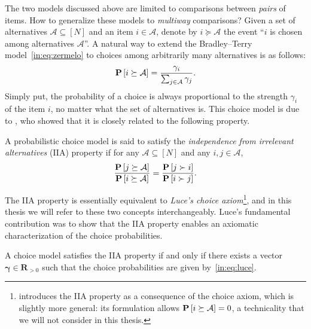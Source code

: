 The two models discussed above are limited to comparisons between \emph{pairs} of items.
How to generalize these models to \emph{multiway} comparisons?
Given a set of alternatives $\mathcal{A} \subseteq [N]$ and an item $i \in \mathcal{A}$, denote by $i \succeq \mathcal{A}$ the event ``$i$ is chosen among alternatives $\mathcal{A}$''.
A natural way to extend the Bradley--Terry model~\eqref{in:eq:zermelo} to choices among arbitrarily many alternatives is as follows:
\begin{align}
\label{in:eq:luce}
\mathbf{P}\left[ i \succeq \mathcal{A} \right] = \frac{\gamma_i}{\sum_{j \in \mathcal{A}} \gamma_j}.
\end{align}
Simply put, the probability of a choice is always proportional to the strength $\gamma_i$ of the item $i$, no matter what the set of alternatives is.
This choice model is due to \citet{luce1959individual}, who showed that it is closely related to the following property.

\begin{definition}
A probabilistic choice model is said to satisfy the \emph{independence from irrelevant alternatives} (IIA) property if for any $\mathcal{A} \subseteq [N]$ and any $i, j \in \mathcal{A}$,
\begin{align*}
\frac{\mathbf{P}\left[ j \succeq \mathcal{A} \right]}{\mathbf{P}\left[ i \succeq \mathcal{A} \right]}
     = \frac{\mathbf{P}\left[ j \succ i \right]}{\mathbf{P}\left[ i \succ j \right]}.
\end{align*}
\end{definition}

The IIA property is essentially equivalent to \emph{Luce's choice axiom}\footnote{%
\citet{luce1959individual} introduces the IIA property as a consequence of the choice axiom, which is slightly more general: its formulation allows $\mathbf{P}\left[ i \succeq \mathcal{A} \right] = 0$, a technicality that we will not consider in this thesis.},
and in this thesis we will refer to these two concepts interchangeably.
Luce's fundamental contribution was to show that the IIA property enables an axiomatic characterization of the choice probabilities.

\begin{proposition}
A choice model satisfies the IIA property if and only if there exists a vector $\bm{\gamma} \in \mathbf{R}_{>0}$ such that the choice probabilities are given by~\eqref{in:eq:luce}.
\end{proposition}

